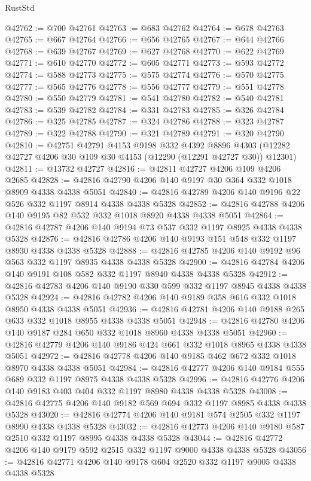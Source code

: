\begin{lexlean}{RustStd}
\begin{coremodule}
@42762 := @700 @42761
@42763 := @683 @42762
@42764 := @678 @42763
@42765 := @667 @42764
@42766 := @656 @42765
@42767 := @644 @42766
@42768 := @639 @42767
@42769 := @627 @42768
@42770 := @622 @42769
@42771 := @610 @42770
@42772 := @605 @42771
@42773 := @593 @42772
@42774 := @588 @42773
@42775 := @575 @42774
@42776 := @570 @42775
@42777 := @565 @42776
@42778 := @556 @42777
@42779 := @551 @42778
@42780 := @550 @42779
@42781 := @541 @42780
@42782 := @540 @42781
@42783 := @539 @42782
@42784 := @331 @42783
@42785 := @326 @42784
@42786 := @325 @42785
@42787 := @324 @42786
@42788 := @323 @42787
@42789 := @322 @42788
@42790 := @321 @42789
@42791 := @320 @42790
@42810 := @42751
    @42791
    @4153
    @9198
    @332
    @4392
    @8896
    @4303
    (@12282 @42727 @4206 @30 @109 @30 @4153 (@12290 (@12291 @42727 @30)) @12301)
@42811 := @13732 @42727
@42816 := @42811 @42727 @4206 @109 @4206 @2685
@42828 := @42816 @42790 @4206 @140 @9197 @30 @364 @332 @1018 @8909 @4338 @4338 @5051
@42840 := @42816 @42789 @4206 @140 @9196 @22 @526 @332 @1197 @8914 @4338 @4338 @5328
@42852 := @42816 @42788 @4206 @140 @9195 @82 @532 @332 @1018 @8920 @4338 @4338 @5051
@42864 := @42816 @42787 @4206 @140 @9194 @73 @537 @332 @1197 @8925 @4338 @4338 @5328
@42876 := @42816 @42786 @4206 @140 @9193 @151 @548 @332 @1197 @8930 @4338 @4338 @5328
@42888 := @42816 @42785 @4206 @140 @9192 @96 @563 @332 @1197 @8935 @4338 @4338 @5328
@42900 := @42816 @42784 @4206 @140 @9191 @108 @582 @332 @1197 @8940 @4338 @4338 @5328
@42912 := @42816 @42783 @4206 @140 @9190 @330 @599 @332 @1197 @8945 @4338 @4338 @5328
@42924 := @42816 @42782 @4206 @140 @9189 @358 @616 @332 @1018 @8950 @4338 @4338 @5051
@42936 := @42816 @42781 @4206 @140 @9188 @265 @633 @332 @1018 @8955 @4338 @4338 @5051
@42948 := @42816 @42780 @4206 @140 @9187 @284 @650 @332 @1018 @8960 @4338 @4338 @5051
@42960 := @42816 @42779 @4206 @140 @9186 @424 @661 @332 @1018 @8965 @4338 @4338 @5051
@42972 := @42816 @42778 @4206 @140 @9185 @462 @672 @332 @1018 @8970 @4338 @4338 @5051
@42984 := @42816 @42777 @4206 @140 @9184 @555 @689 @332 @1197 @8975 @4338 @4338 @5328
@42996 := @42816 @42776 @4206 @140 @9183 @403 @404 @332 @1197 @8980 @4338 @4338 @5328
@43008 := @42816 @42775 @4206 @140 @9182 @569 @694 @332 @1197 @8985 @4338 @4338 @5328
@43020 := @42816 @42774 @4206 @140 @9181 @574 @2505 @332 @1197 @8990 @4338 @4338 @5328
@43032 := @42816 @42773 @4206 @140 @9180 @587 @2510 @332 @1197 @8995 @4338 @4338 @5328
@43044 := @42816 @42772 @4206 @140 @9179 @592 @2515 @332 @1197 @9000 @4338 @4338 @5328
@43056 := @42816 @42771 @4206 @140 @9178 @604 @2520 @332 @1197 @9005 @4338 @4338 @5328

\end{coremodule}
\end{lexlean}
